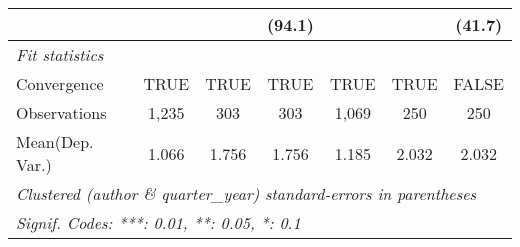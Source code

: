 \begin{tabular}{lcccccc}
                           &               &         & (94.1)  &               &         & (41.7)\\   
   \midrule
   \emph{Fit statistics}\\
   Convergence             &TRUE           & TRUE    & TRUE    & TRUE          & TRUE    & FALSE\\  
   Observations            & 1,235         & 303     & 303     & 1,069         & 250     & 250\\  
Mean(Dep. Var.) & 1.066 & 1.756 & 1.756 & 1.185 & 2.032 & 2.032 \\
   \midrule \midrule
   \multicolumn{7}{l}{\emph{Clustered (author \& quarter\_year) standard-errors in parentheses}}\\
   \multicolumn{7}{l}{\emph{Signif. Codes: ***: 0.01, **: 0.05, *: 0.1}}\\
\end{tabular}
\par\endgroup
